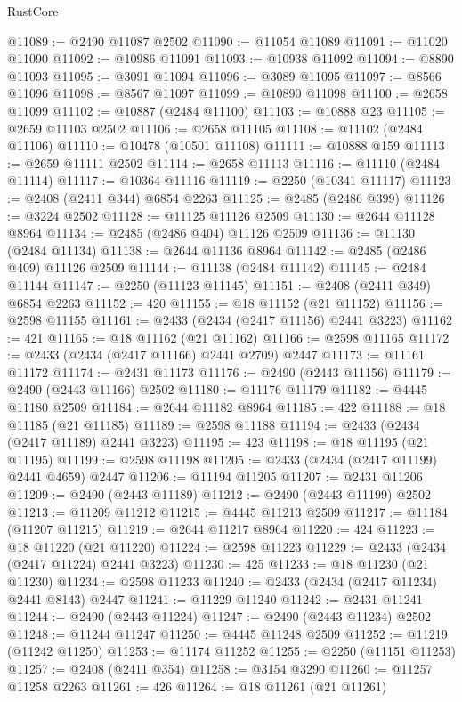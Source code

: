 \begin{lexlean}{RustCore}
\begin{coremodule}
@11089 := @2490 @11087 @2502
@11090 := @11054 @11089
@11091 := @11020 @11090
@11092 := @10986 @11091
@11093 := @10938 @11092
@11094 := @8890 @11093
@11095 := @3091 @11094
@11096 := @3089 @11095
@11097 := @8566 @11096
@11098 := @8567 @11097
@11099 := @10890 @11098
@11100 := @2658 @11099
@11102 := @10887 (@2484 @11100)
@11103 := @10888 @23
@11105 := @2659 @11103 @2502
@11106 := @2658 @11105
@11108 := @11102 (@2484 @11106)
@11110 := @10478 (@10501 @11108)
@11111 := @10888 @159
@11113 := @2659 @11111 @2502
@11114 := @2658 @11113
@11116 := @11110 (@2484 @11114)
@11117 := @10364 @11116
@11119 := @2250 (@10341 @11117)
@11123 := @2408 (@2411 @344) @6854 @2263
@11125 := @2485 (@2486 @399)
@11126 := @3224 @2502
@11128 := @11125 @11126 @2509
@11130 := @2644 @11128 @8964
@11134 := @2485 (@2486 @404) @11126 @2509
@11136 := @11130 (@2484 @11134)
@11138 := @2644 @11136 @8964
@11142 := @2485 (@2486 @409) @11126 @2509
@11144 := @11138 (@2484 @11142)
@11145 := @2484 @11144
@11147 := @2250 (@11123 @11145)
@11151 := @2408 (@2411 @349) @6854 @2263
@11152 := 420
@11155 := @18 @11152 (@21 @11152)
@11156 := @2598 @11155
@11161 := @2433 (@2434 (@2417 @11156) @2441 @3223)
@11162 := 421
@11165 := @18 @11162 (@21 @11162)
@11166 := @2598 @11165
@11172 := @2433 (@2434 (@2417 @11166) @2441 @2709) @2447
@11173 := @11161 @11172
@11174 := @2431 @11173
@11176 := @2490 (@2443 @11156)
@11179 := @2490 (@2443 @11166) @2502
@11180 := @11176 @11179
@11182 := @4445 @11180 @2509
@11184 := @2644 @11182 @8964
@11185 := 422
@11188 := @18 @11185 (@21 @11185)
@11189 := @2598 @11188
@11194 := @2433 (@2434 (@2417 @11189) @2441 @3223)
@11195 := 423
@11198 := @18 @11195 (@21 @11195)
@11199 := @2598 @11198
@11205 := @2433 (@2434 (@2417 @11199) @2441 @4659) @2447
@11206 := @11194 @11205
@11207 := @2431 @11206
@11209 := @2490 (@2443 @11189)
@11212 := @2490 (@2443 @11199) @2502
@11213 := @11209 @11212
@11215 := @4445 @11213 @2509
@11217 := @11184 (@11207 @11215)
@11219 := @2644 @11217 @8964
@11220 := 424
@11223 := @18 @11220 (@21 @11220)
@11224 := @2598 @11223
@11229 := @2433 (@2434 (@2417 @11224) @2441 @3223)
@11230 := 425
@11233 := @18 @11230 (@21 @11230)
@11234 := @2598 @11233
@11240 := @2433 (@2434 (@2417 @11234) @2441 @8143) @2447
@11241 := @11229 @11240
@11242 := @2431 @11241
@11244 := @2490 (@2443 @11224)
@11247 := @2490 (@2443 @11234) @2502
@11248 := @11244 @11247
@11250 := @4445 @11248 @2509
@11252 := @11219 (@11242 @11250)
@11253 := @11174 @11252
@11255 := @2250 (@11151 @11253)
@11257 := @2408 (@2411 @354)
@11258 := @3154 @3290
@11260 := @11257 @11258 @2263
@11261 := 426
@11264 := @18 @11261 (@21 @11261)

\end{coremodule}
\end{lexlean}
